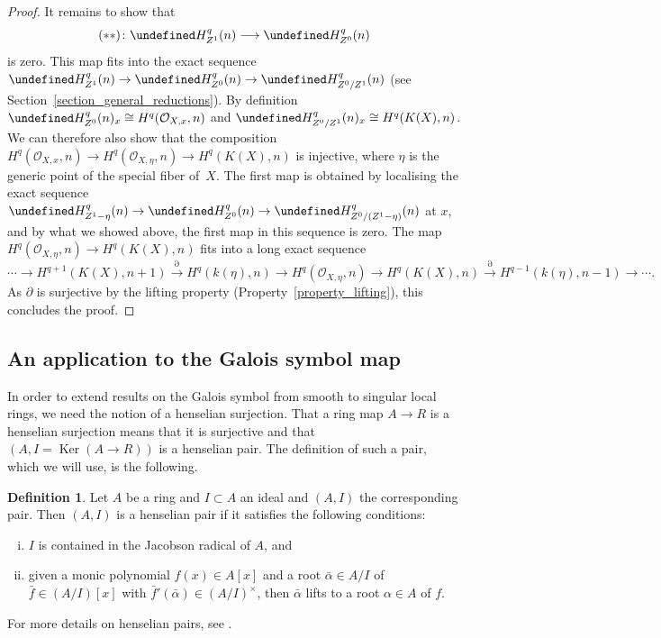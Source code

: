 \documentclass[10pt,a4paper]{article}
\let\cal\undefined
\numberwithin{equation}{section}
\newtheorem{Key lemma}[theorem]{Key lemma}
\theoremstyle{definition}
\newtheorem{definition}[theorem]{Definition}
\theoremstyle{remark}
\newcommand{\roi}{\mathcal{O}}
\newcommand{\To}{\longrightarrow}
\newcommand{\cal}{\mathcal}
\renewcommand{\ker}{\operatorname{Ker}}
\newcommand{\xTo}[1]{\stackrel{#1}{\To}}
\begin{document}
\begin{proof}
It remains to show that
$$(**)\colon\cal H^q_{Z^{1}}(n)\To \cal H^q_{Z^0}(n)$$
is zero. This map fits into the exact sequence $\cal H^q_{Z^{1}}(n)\to \cal H^q_{Z^0}(n)\to \cal H^q_{Z^0/Z^1}(n)$ (see Section~\ref{section_general_reductions}). By definition $\cal H^q_{Z^0}(n)_x\cong H^q_{}(\roi_{X,x},n)$ and $\cal H^q_{Z^0/Z^1}(n)_x\cong H^q_{}(K(X),n)$. We can therefore also show that the composition  $ H^q_{}(\roi_{X,x},n)\to H^q_{}(\roi_{X,\eta},n) \to H^q_{}(K(X),n)$ is injective, where $\eta$ is the generic point of the special fiber of~$X$. The first map is obtained by localising the exact sequence $\cal H^q_{Z^1-\eta}(n)\to \cal H^q_{Z^0}(n) \to \cal H^q_{Z^0/(Z^1-\eta)}(n)$ at $x$, and by what we showed above, the first map in this sequence is zero.  
The map $H^q_{}(\roi_{X,\eta},n) \to H^q_{}(K(X),n)$ fits into a long exact sequence
$$\cdots\To H^{q+1}_{}(K(X),n+1)\xTo{\partial} H^{q}_{}(k(\eta),n) \To H^q_{}(\roi_{X,\eta},n) \To H^q_{}(K(X),n)\xTo{\partial}  H^{q-1}_{}(k(\eta),n-1)\To\cdots .$$ 
As $\partial$ is surjective by the lifting property (Property~\ref{property_lifting}), this concludes the proof.
\end{proof}


\subsection{An application to the Galois symbol map}
In order to extend results on the Galois symbol from smooth to singular local rings, we need the notion of a henselian surjection.
That a ring map $A\to R$ is a henselian surjection means that it is surjective and that $(A,I=\ker(A\to R))$ is a henselian pair. The definition of such a pair, which we will use, is the following. 

\begin{definition}  Let $A$ be a ring and $I\subset A$ an ideal and $(A,I)$ the corresponding pair. Then $(A,I)$ is a henselian pair if it satisfies the following conditions:
\begin{enumerate}[(i)]
\item $I$ is contained in the Jacobson radical of $A$, and
\item given a monic polynomial $f(x)\in A[x]$ and a root $\bar\alpha\in A/I$ of $\bar f\in (A/I)[x]$ with $\bar f'(\bar \alpha)\in (A/I)^\times$, then $\bar\alpha$ lifts to a root $\alpha\in A$ of $f$.
\end{enumerate}
\end{definition}

For more details on henselian pairs, see \cite[Tag 09XD]{stacks-project}.
\end{document}
